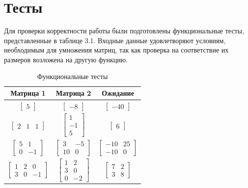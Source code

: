 \documentclass[12pt, a4paper]{report}
\begin{document}
	\newpage

	\section{Тесты}
	Для проверки корректности работы были подготовлены функциональные тесты, представленные в таблице 3.1. Входные данные удовлетворяют условиям, необходимым для умножения матриц, так как проверка на соответствие их размеров возложена на другую функцию.

	\begin{table}[ht!]
		\caption{Функциональные тесты}
		\begin{center}
			\begin{tabular}{|c|c|c|}
			\hline
			\bf{Матрица 1} & \bf{Матрица 2} & \bf{Ожидание}\\\hline
			
			$\begin{bmatrix}5\end{bmatrix}$ &
			$\begin{bmatrix}-8\end{bmatrix}$ &
			$\begin{bmatrix}-40\end{bmatrix}$\\\hline
			
			$\begin{bmatrix}2 & 1 & 1\end{bmatrix}$ &
			$\begin{bmatrix}1\\-1\\5\end{bmatrix}$ &
			$\begin{bmatrix}6\end{bmatrix}$\\\hline
			
			$\begin{bmatrix}5 & 1\\0 & -1\end{bmatrix}$ &
			$\begin{bmatrix}3 & -5\\10 & 0\end{bmatrix}$ &
			$\begin{bmatrix}-10 & 25\\-10 & 0\end{bmatrix}$\\\hline
			
			$\begin{bmatrix}1 & 2 & 0\\3 & 0 & -1\end{bmatrix}$ &
			$\begin{bmatrix}1 & 2\\3 & 0\\0 & -2\end{bmatrix}$ &
			$\begin{bmatrix}7 & 2\\3 & 8\end{bmatrix}$\\\hline
			

\end{tabular}
\end{center}
\end{table}
\end{document}
